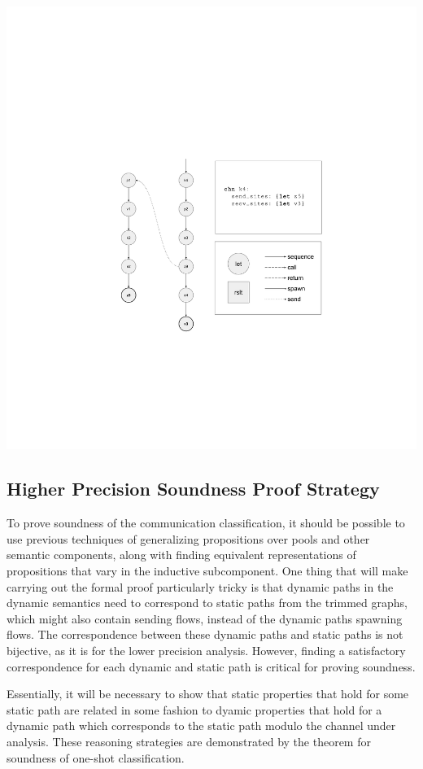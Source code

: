 \documentclass[10pt]{article}
\begin{document}
\includegraphics[width=1.3\textwidth, left]{cml_graph_k4.pdf}

\subsection{Higher Precision Soundness Proof Strategy}
To prove soundness of the communication classification, it should be possible to use
previous techniques of generalizing propositions over pools and other semantic components,
along with finding equivalent representations of propositions that vary in the inductive
subcomponent. One thing that will make carrying out the formal proof particularly tricky is
that dynamic paths in the dynamic semantics need to correspond to static paths from
the trimmed graphs, which might also contain sending flows,
instead of the dynamic paths spawning flows.
The correspondence between these dynamic paths and static paths
is not bijective, as it is for the lower precision analysis. However, finding a satisfactory
correspondence for each dynamic and static path is critical for proving soundness.

Essentially, it will be necessary to show that static
properties that hold for some static path are related in some fashion to dyamic properties
that hold for a dynamic path which corresponds to the static path modulo the channel under
analysis. These reasoning strategies are demonstrated by the theorem for soundness of
one-shot classification.
\end{document}
